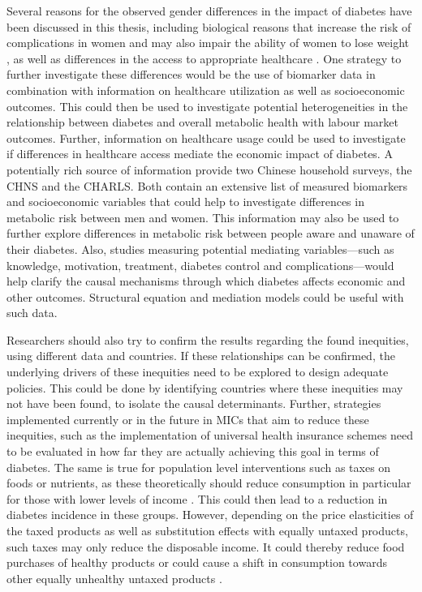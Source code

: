 Several reasons for the observed gender differences in the impact of diabetes have been discussed in this thesis, including biological reasons that increase the risk of complications in women \textcite{Peters2014,Peters2015,Arnetz2014,Roche2013,Policardo2014,Catalan2015,Engelmann2016,Seghieri2015} and may also impair the ability of women to lose weight \parencite{Penno2013}, as well as differences in the access to appropriate healthcare \parencite{Penno2013}. One strategy to further investigate these differences would be the use of biomarker data in combination with information on healthcare utilization as well as socioeconomic outcomes. This could then be used to investigate potential heterogeneities in the relationship between diabetes and overall metabolic health with labour market outcomes. Further, information on healthcare usage could be used to investigate if differences in healthcare access mediate the economic impact of diabetes. A potentially rich source of information provide two Chinese household surveys, the \acf{CHNS} and the \acf{CHARLS}. Both contain an extensive list of measured biomarkers and socioeconomic variables that could help to investigate differences in metabolic risk between men and women. This information may also be used to further explore differences in metabolic risk between people aware and unaware of their diabetes. Also, studies measuring potential mediating variables---such as knowledge, motivation, treatment, diabetes control and complications---would help clarify the causal mechanisms through which diabetes affects economic and other outcomes. Structural equation and mediation models could be useful with such data. 

Researchers should also try to confirm the results regarding the found inequities, using different data and countries. If these relationships can be confirmed, the underlying drivers of these inequities need to be explored to design adequate policies. This could be done by identifying countries where these inequities may not have been found, to isolate the causal determinants. Further, strategies implemented currently or in the future in \acp{MIC} that aim to reduce these inequities, such as the implementation of universal health insurance schemes need to be evaluated in how far they are actually achieving this goal in terms of diabetes. The same is true for population level interventions such as taxes on foods or nutrients, as these theoretically should reduce consumption in particular for those with lower levels of income \parencite{Mytton2012c}. This could then lead to a reduction in diabetes incidence in these groups. However, depending on the price elasticities of the taxed products as well as substitution effects with equally untaxed products, such taxes may only reduce the disposable income. It could thereby reduce food purchases of healthy products or could cause a shift in consumption towards other equally unhealthy untaxed products \parencite{Mytton2012c}.


